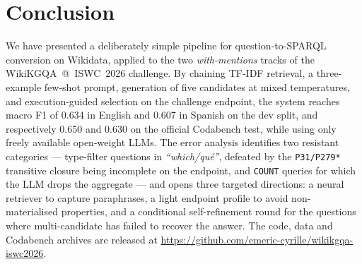 \documentclass[]{ceurart}
\begin{document}
\section{Conclusion}
\label{sec:conclusion}
We have presented a deliberately simple pipeline for question-to-SPARQL conversion on Wikidata, applied to the two \emph{with-mentions} tracks of the WikiKGQA~@~ISWC~2026 challenge. By chaining TF-IDF retrieval, a three-example few-shot prompt, generation of five candidates at mixed temperatures, and execution-guided selection on the challenge endpoint, the system reaches macro F1 of 0.634 in English and 0.607 in Spanish on the dev split, and respectively 0.650 and 0.630 on the official Codabench test, while using only freely available open-weight LLMs. The error analysis identifies two resistant categories — type-filter questions in \emph{``which/qu\'e''}, defeated by the \texttt{P31/P279*} transitive closure being incomplete on the endpoint, and \texttt{COUNT} queries for which the LLM drops the aggregate — and opens three targeted directions: a neural retriever to capture paraphrases, a light endpoint profile to avoid non-materialised properties, and a conditional self-refinement round for the questions where multi-candidate has failed to recover the answer. The code, data and Codabench archives are released at \url{https://github.com/emeric-cyrille/wikikgqa-iswc2026}.


\end{document}
